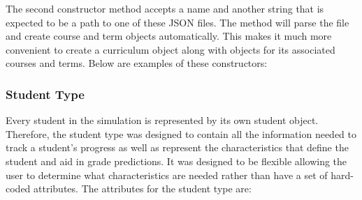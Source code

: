 \documentclass[botnum, fleqn]{unmeethesis}
\begin{document}
    

    The second constructor method accepts a name and another string that is expected to be a path to one of these JSON files. The method will parse the file and create course and term objects automatically. This makes it much more convenient to create a curriculum object along with objects for its associated courses and terms. Below are examples of these constructors:

    

    \subsubsection{Student Type}
    Every student in the simulation is represented by its own student object. Therefore, the student type was designed to contain all the information needed to track a student's progress as well as represent the characteristics that define the student and aid in grade predictions. It was designed to be flexible allowing the user to determine what characteristics are needed rather than have a set of hard-coded attributes. The attributes for the student type are:
\end{document}
